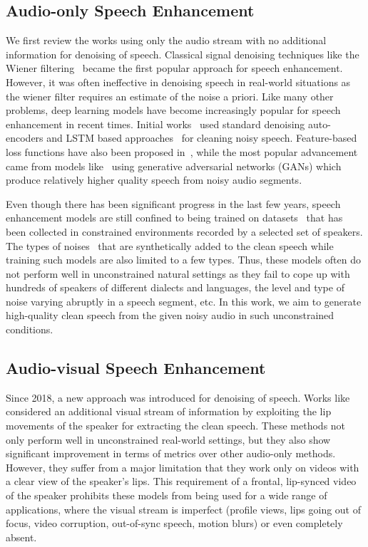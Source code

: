 \documentclass[10pt,twocolumn,letterpaper]{article}
\begin{document}
\subsection{Audio-only Speech Enhancement}
We first review the works using only the audio stream with no additional information for denoising of speech. Classical signal denoising techniques like the Wiener filtering~\cite{wienerfilter} became the first popular approach for speech enhancement. However, it was often ineffective in denoising speech in real-world situations as the wiener filter requires an estimate of the noise a priori. Like many other problems, deep learning models have become increasingly popular for speech enhancement in recent times. Initial works~\cite{boltzmann_2015_sui,Lu2013SpeechEB} used standard denoising auto-encoders and LSTM based approaches~\cite{8461944, ValentiniBotinhao2016InvestigatingRS} for cleaning noisy speech. Feature-based loss functions have also been proposed in~\cite{Germain2019SpeechDW}, while the most popular advancement came from models like~\cite{segan, Donahue2018ExploringSE,Germain2019SpeechDW,ConditionalGA_2017_Michelsanti} using generative adversarial networks (GANs) which produce relatively higher quality speech from noisy audio segments.  

Even though there has been significant progress in the last few years, speech enhancement models are still confined to being trained on datasets~\cite{ValentiniBotinhao2016InvestigatingRS, Dean2010TheQC,6709856, timit} that has been collected in constrained environments recorded by a selected set of speakers. The types of noises~\cite{ValentiniBotinhao2017NoisySD, piczak2015dataset} that are synthetically added to the clean speech while training such models are also limited to a few types. Thus, these models often do not perform well in unconstrained natural settings as they fail to cope up with hundreds of speakers of different dialects and languages, the level and type of noise varying abruptly in a speech segment, etc. In this work, we aim to generate high-quality clean speech from the given noisy audio in such unconstrained conditions.  

\subsection{Audio-visual Speech Enhancement}
Since 2018, a new approach was introduced for denoising of speech. Works like~\cite{cocktailparty_erphat_2018,TheConversation_Afouras_2018, Owens_2018_ECCV} considered an additional visual stream of information by exploiting the lip movements of the speaker for extracting the clean speech. These methods not only perform well in unconstrained real-world settings, but they also show significant improvement in terms of metrics over other audio-only methods. However, they suffer from a major limitation that they work only on videos with a clear view of the speaker's lips. This requirement of a frontal, lip-synced video of the speaker prohibits these models from being used for a wide range of applications, where the visual stream is imperfect (profile views, lips going out of focus, video corruption, out-of-sync speech, motion blurs) or even completely absent.
\end{document}
